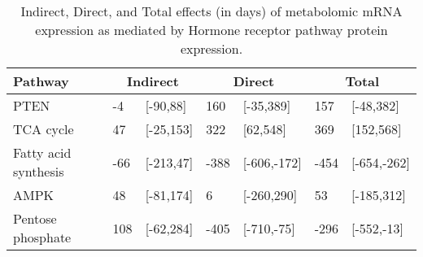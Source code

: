 \begin{table}[ht]
\centering
\begin{tabular}{lllllll}
  \hline
  Pathway & \multicolumn{2}{c}{Indirect} & \multicolumn{2}{c}{Direct}  & \multicolumn{2}{c}{Total} \\
 \hline
PTEN & -4 & [-90,88] & 160 & [-35,389] & 157 & [-48,382] \\ 
  TCA cycle & 47 & [-25,153] & 322 & [62,548] & 369 & [152,568] \\ 
  Fatty acid synthesis & -66 & [-213,47] & -388 & [-606,-172] & -454 & [-654,-262] \\ 
  AMPK & 48 & [-81,174] & 6 & [-260,290] & 53 & [-185,312] \\ 
  Pentose phosphate & 108 & [-62,284] & -405 & [-710,-75] & -296 & [-552,-13] \\ 
   \hline
\end{tabular}
\caption{Indirect, Direct, and Total effects (in days) of metabolomic mRNA expression as mediated by Hormone receptor pathway protein expression.} 
\end{table}
